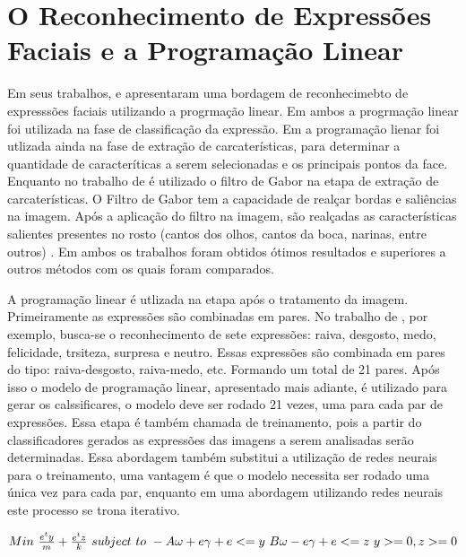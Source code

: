 \section{O Reconhecimento de Expressões Faciais e a Programação Linear}

Em seus trabalhos,  e  apresentaram uma bordagem de reconhecimebto de expresssões faciais utilizando a progrmação linear. Em ambos a progrmação linear foi utilizada na fase de classificação da expressão. Em  a programação lienar foi utlizada ainda na fase de extração de carcaterísticas, para determinar a quantidade de caracteríticas a serem selecionadas e os principais pontos da face. Enquanto no trabalho de \cite{Feng} é utilizado o filtro de Gabor na etapa de extração de carcaterísticas. O Filtro de Gabor tem a capacidade de realçar bordas e saliências na imagem. Após a aplicação do filtro na imagem, são realçadas as características salientes presentes no rosto (cantos dos olhos, cantos da boca, narinas, entre outros) \cite{Gabor}. Em ambos os trabalhos foram obtidos ótimos resultados e superiores a outros métodos com os quais foram comparados. 

A programação linear é utlizada na etapa após o tratamento da imagem. Primeiramente as expressões são combinadas em pares. No trabalho de \cite{Feng}, por exemplo, busca-se o reconhecimento de sete expressões: raiva, desgosto, medo, felicidade, trsiteza, surpresa e neutro. Essas expressões são combinada em pares do tipo: raiva-desgosto, raiva-medo, etc. Formando um total de 21 pares. Após isso o modelo de programação linear, apresentado mais adiante, é utilizado para gerar os calssificares, o modelo deve ser rodado 21 vezes, uma para cada par de expressões. Essa etapa é também chamada de treinamento, pois a partir do classificadores gerados as expressões das imagens a serem analisadas serão determinadas. Essa abordagem também substitui a utilização de redes neurais para o treinamento, uma vantagem é que o modelo necessita ser rodado uma única vez para cada par, enquanto em uma abordagem utilizando redes neurais este processo se trona iterativo.

$Min\ \frac{e^{t}y}{m} + \frac{e^{t}z}{k}\\
\ subject\ to  \\
\              -A\omega + e\gamma + e <= y\\
\              B\omega - e\gamma + e <= z\\
\              y>= 0, z>= 0 $


